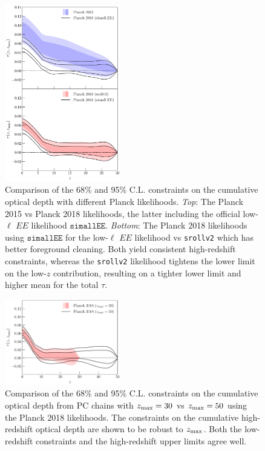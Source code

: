 \documentclass[prd,twocolumn,amsmath,amssymb,floatfix,superscriptaddress,nofootinbib]{revtex4-1}
\newcommand{\zmax}{z_{\rm max}}
\begin{document}
{\begin{figure}[ht]
\includegraphics[width=0.45\textwidth]{paper/plots/pl18_taugtz_pc_zmax30_pl15_vs_pl18_simallEE_vs_pl18_srollv2.pdf}
\caption{Comparison of the 68\% and 95\% C.L. constraints on the cumulative optical depth with different Planck likelihoods. \textit{Top}: The Planck 2015 vs Planck 2018 likelihoods, the latter including the official low-$\ell$ $EE$ likelihood $\texttt{simallEE}$. \textit{Bottom}: The Planck 2018 likelihoods using $\texttt{simallEE}$ for the low-$\ell$ $EE$ likelihood vs \texttt{srollv2} which has better foreground cleaning. Both yield consistent high-redshift constraints, whereas the \texttt{srollv2} likelihood tightens the lower limit on the low-$z$ contribution, resulting on a tighter lower limit and higher mean for the total $\tau$.
}
\label{fig:plot_taugtz_2015_vs_2018_simallEE_vs_2018_srollv2}
\end{figure}


\begin{figure}[ht]
\includegraphics[width=0.45\textwidth]{paper/plots/pl18_taugtz_pl18_srollv2_pc_zmax30_vs_zmax50.pdf}
\caption{Comparison of the 68\% and 95\% C.L. constraints on the cumulative optical depth from PC chains with $\zmax = 30$ vs $\zmax = 50$ using the Planck 2018 likelihoods. The constraints on the cumulative high-redshift optical depth are shown to be robust to $\zmax$. Both the low-redshift constraints and the high-redshift upper limits agree well.
}
\label{fig:plot_taugtz_zmax30_vs_zmax50}
\end{figure}


}
\end{document}
